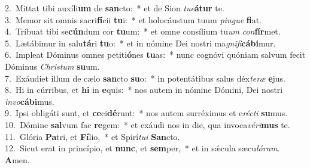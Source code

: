 {2.~}Mittat tibi auxíli\textbf{um} de \textbf{san}cto:~* et de Sion \textit{tu}\textit{e}\textbf{á}\textbf{tur} te.\\
{3.~}Memor sit omnis sacri\textbf{fí}cii \textbf{tu}i:~* et holocáustum tuum \textit{pin}\textit{gue} \textbf{fi}at.\\
{4.~}Tríbuat tibi se\textbf{cún}dum cor \textbf{tu}um:~* et omne consílium tu\textit{um} \textit{con}\textbf{fír}met.\\
{5.~}Lætábimur in salu\textbf{tá}ri \textbf{tu}o:~* et in nómine Dei nostri ma\textit{gni}\textit{fi}\textbf{cá}\textbf{bi}mur.\\
{6.~}Impleat Dóminus omnes petiti\textbf{ó}nes \textbf{tu}as:~* nunc cognóvi quóniam salvum fecit Dóminus \textit{Chri}\textit{stum} \textbf{su}um.\\
{7.~}Exáudiet illum de cælo \textbf{san}cto \textbf{su}o:~* in potentátibus salus déx\textit{te}\textit{ræ} \textbf{e}jus.\\
{8.~}Hi in cúrribus, et \textbf{hi} in \textbf{e}quis:~* nos autem in nómine Dómini, Dei nostri \textit{in}\textit{vo}\textbf{cá}\textbf{bi}mus.\\
{9.~}Ipsi obligáti sunt, et \textbf{ce}ci\textbf{dé}runt:~* nos autem surréximus et e\textit{ré}\textit{cti} \textbf{su}mus.\\
{10.~}Dómine \textbf{sal}vum fac \textbf{re}gem:~* et exáudi nos in die, qua invoca\textit{vé}\textit{ri}\textbf{mus} te.\\
{11.~}Glória \textbf{Pa}tri, et \textbf{Fí}lio,~* et Spirí\textit{tu}\textit{i} \textbf{San}cto.\\
{12.~}Sicut erat in princípio, et \textbf{nunc}, et \textbf{sem}per,~* et in sǽcula sæcu\textit{ló}\textit{rum}. \textbf{A}men.\\
